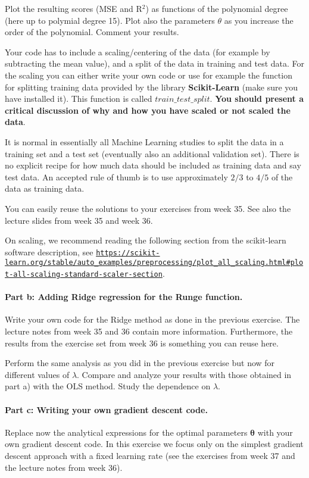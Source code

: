 \documentclass[%
oneside,                 %
final,                   %
10pt]{article}
\begin{document}
Plot the resulting scores (MSE and R$^2$) as functions of the polynomial degree (here up to polymial degree 15).
Plot also the parameters $\theta$ as you increase the order of the polynomial. Comment your results.

Your code has to include a scaling/centering of the data (for example by
subtracting the mean value), and
a split of the data in training and test data. For the scaling  you can
either write your own code or use for example the function for
splitting training data provided by the library \textbf{Scikit-Learn} (make
sure you have installed it).  This function is called
$train\_test\_split$.  \textbf{You should present a critical discussion of why and how you have scaled or not scaled the data}.

It is normal in essentially all Machine Learning studies to split the
data in a training set and a test set (eventually  also an additional
validation set).  There
is no explicit recipe for how much data should be included as training
data and say test data.  An accepted rule of thumb is to use
approximately $2/3$ to $4/5$ of the data as training data.

You can easily reuse the solutions to your exercises from week 35.
See also the lecture slides from week 35 and week 36.

On scaling, we recommend reading the following section from the scikit-learn software description, see \href{{https://scikit-learn.org/stable/auto_examples/preprocessing/plot_all_scaling.html#plot-all-scaling-standard-scaler-section}}{\nolinkurl{https://scikit-learn.org/stable/auto_examples/preprocessing/plot_all_scaling.html\#plot-all-scaling-standard-scaler-section}}.

\paragraph{Part b: Adding Ridge regression for  the Runge  function.}
Write your own code for the Ridge method as done in the previous
exercise. The lecture notes from week 35 and 36 contain more information. Furthermore, the  results from the exercise set from week 36 is something you can reuse here.

Perform the same analysis as you did in the previous exercise but now for different values of $\lambda$. Compare and
analyze your results with those obtained in part a) with the OLS  method. Study the
dependence on $\lambda$.

\paragraph{Part c: Writing your own gradient descent code.}
Replace now the analytical expressions for the optimal parameters
$\bm{\theta}$ with your own gradient descent code. In this exercise we
focus only on the simplest gradient descent approach with a fixed
learning rate (see the exercises from week 37 and the lecture notes
from week 36).
\end{document}
